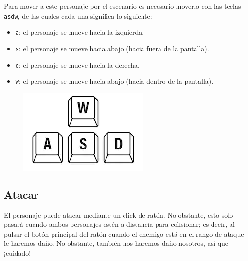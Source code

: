 \documentclass[11pt,a4paper]{article}
\begin{document}
Para mover a este personaje por el escenario es necesario moverlo con las teclas \color{morado}\texttt{asdw}\color{black}, de las cuales cada una significa lo siguiente:

	\begin{itemize}
		\item \color{morado}\texttt{a}\color{black}: el personaje se mueve hacia la izquierda.
		\item \color{morado}\texttt{s}\color{black}: el personaje se mueve hacia abajo (hacia fuera de la pantalla).
		\item \color{morado}\texttt{d}\color{black}: el personaje se mueve hacia la derecha.
		\item \color{morado}\texttt{w}\color{black}: el personaje se mueve hacia abajo (hacia dentro de la pantalla).
	\end{itemize}
	
\begin{figure}[H]
	\centering
	\includegraphics[scale=0.5]{img/teclas.png}
\end{figure}

\subsection{Atacar}

El personaje puede atacar mediante un click de ratón. No obstante, esto solo pasará cuando ambos personajes estén a distancia para colisionar; es decir, al pulsar el botón principal del ratón cuando el enemigo está en el rango de ataque le haremos daño. No obstante, también nos haremos daño nosotros, así que ¡cuidado!
\end{document}
